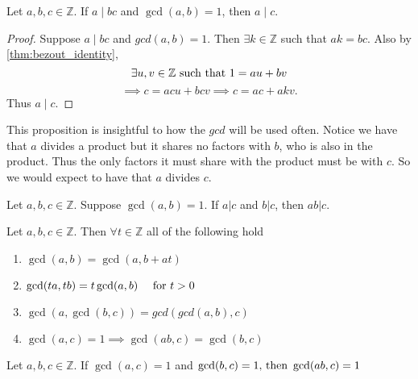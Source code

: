 \documentclass[../main.tex]{subfiles}
\begin{document}
\begin{proposition}\label{prp:coprime_divisor_of_product}
Let \(a,b,c \in \mathbb{Z}\). If \(a \mid bc \) and \(\gcd(a,b) = 1\), then \(a \mid c\).
    
\end{proposition}

\begin{proof}
Suppose \(a \mid bc \) and \(gcd(a,b) = 1\). Then \(\exists k \in \mathbb{Z}\) such that \(ak = bc\). Also by \ref{thm:bezout_identity},\[
\exists u,v \in \mathbb{Z} \textnormal{ such that } 1 = au + bv
\]
\[
\implies c = acu + bcv \implies c = ac + akv.
\]
Thus \(a \mid c\).
\end{proof}

\begin{remark}
This proposition is insightful to how the \(gcd\) will be used often. Notice we have that \(a\) divides a product but it shares no factors with \(b\), who is also in the product. Thus the only factors it must share with the product must be with \(c\). So we would expect to have that \(a\) divides \(c\).
\end{remark}





\begin{exercise}
Let $ a,b,c \in \mathbb{Z}$. Suppose $ \gcd(a,b) = 1$. If $a|c$ and $b|c$, then $ab|c.$
\end{exercise}





\begin{exercise}
Let $ a,b,c \in \mathbb{Z}$. Then $ \forall t \in \mathbb{Z}$ all of the following hold
\begin{enumerate}
    \item $\gcd(a,b) = \gcd(a,b + at)$
    \item $\gcd(ta,tb) = t\gcd(a,b) \quad \textnormal{ for } t > 0$
    \item $\gcd(a, \gcd(b,c)) = gcd(gcd(a,b), c)$
    \item $\gcd(a,c) = 1 \implies \gcd(ab, c) = \gcd(b,c) $
\end{enumerate}

\end{exercise}




\begin{exercise}
Let $ a,b,c \in \mathbb{Z}$. If $\gcd(a,c) = 1 $ and $\gcd(b,c)=1 \textnormal{, then }\gcd(ab,c) = 1 $
\end{exercise}
\end{document}
